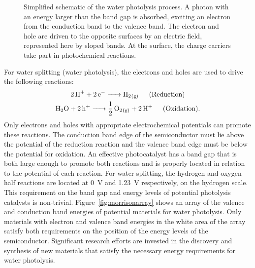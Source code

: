\documentclass[12pt,%
              twoside,
               letterpaper]{uiothesis}
\begin{document}
\begin{figure}
	\caption[Simplified schematic of the water photolysis process]{%
		Simplified schematic of the water photolysis process. A photon 
		with an energy larger than the band gap is absorbed, exciting 
		an electron from the conduction band to the valence band. The 
		electron and hole are driven to the opposite surfaces by an electric field, 
		represented here by sloped bands. At the surface, the charge 
		carriers take part in photochemical reactions.}
	\label{fig:photochemsteps}
\end{figure}

For water splitting (water photolysis),\cite{memming2001semiconductor} the electrons and
holes are used to drive the following reactions:
\begin{gather}
	\ce{2H+ + 2e^{-} -> H2_{(g)}} \hspace{1.5em} \text{(Reduction)}\\
	\ce{H2O + 2h+ -> 1/2O2_{(g)} + 2H+} \hspace{1.5em} \text{(Oxidation).}
\end{gather}
Only electrons and holes with appropriate electrochemical potentials can promote these
reactions. The conduction band edge of the semiconductor must lie above the potential of
the reduction reaction and the valence band edge must be below the potential for
oxidation. An effective photocatalyst has a band gap that is both large enough to promote
both reactions and is properly located in relation to the potential of each reaction. For
water splitting, the hydrogen and oxygen half reactions are located at 0~V and 1.23~V
respectively,\cite{noauthororeditor2007handbook} on the hydrogen scale. This requirement
on the band gap and energy levels of potential photolysis catalysts is non-trivial.
Figure~\ref{fig:morrisonarray} shows an array of the valence and conduction band energies of
potential materials for water photolysis.\cite{Morrison:1980va} Only materials with
electron and valence band energies in the white area of the array satisfy both
requirements on the position of the energy levels of the semiconductor. Significant
research efforts\cite{Osterloh:2008fp} are invested in the discovery and synthesis of new
materials that satisfy the necessary energy requirements for water photolysis. 
\end{document}
